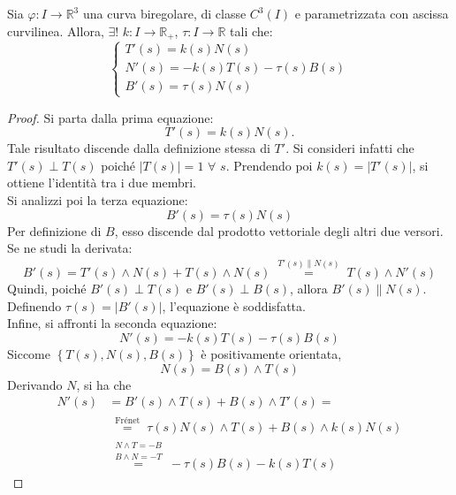 \begin{theorem} \label{Teo: Formule di Frénet}
    Sia $\varphi: I \to \mathbb{R}^3$ una curva biregolare, di classe $C^3(I)$ e parametrizzata con ascissa curvilinea. Allora, $\exists!$ $k:I\to \mathbb{R}_+$, $\tau:I\to\mathbb{R}$ tali che:
    \begin{equation*}
        \begin{cases}
            T'(s)=k(s)N(s)\\
            N'(s)=-k(s)T(s)-\tau(s)B(s)\\
            B'(s)=\tau(s)N(s)
        \end{cases}
    \end{equation*}
    \end{theorem}
    \begin{proof}
        Si parta dalla prima equazione: 
        \begin{equation*}
            T'(s)=k(s)N(s).        
        \end{equation*}
        Tale risultato discende dalla definizione stessa di $T'$. Si consideri infatti che $T'(s)\perp T(s)$ poiché $|T(s)|=1$ $\forall$ $s$. Prendendo poi $k(s)=|T'(s)|$, si ottiene l'identità tra i due membri.\\
        Si analizzi poi la terza equazione:
        \begin{equation*}
            B'(s)=\tau(s)N(s)
        \end{equation*}
        Per definizione di $B$, esso discende dal prodotto vettoriale degli altri due versori. Se ne studi la derivata:
        \begin{equation*}
            B'(s)=T'(s)\wedge N(s) + T(s) \wedge N(s) \overset{\substack{T'(s)\parallel N(s)}}{=} T(s)\wedge N'(s)
        \end{equation*}
        Quindi, poiché $B'(s)\perp T(s)$ e $B'(s) \perp B(s)$, allora $B'(s) \parallel N(s)$. Definendo $\tau(s)=|B'(s)|$, l'equazione è soddisfatta.\\
        Infine, si affronti la seconda equazione:
        \begin{equation*}
            N'(s)= -k(s)T(s)- \tau(s)B(s)
        \end{equation*}
        Siccome $\left\{T(s), N(s), B(s)\right\}$ è positivamente orientata,
        \begin{equation*}
            N(s)=B(s) \wedge T(s)
        \end{equation*}
        Derivando $N$, si ha che
        \begin{equation*}
            \begin{aligned}
                N'(s)&=B'(s)\wedge T(s) + B(s) \wedge T'(s)=\\
                &\overset{\substack{\text{Frénet}}}{=} \tau(s)N(s)\wedge T(s) + B(s) \wedge k(s)N(s)\\
                &\overset{\substack{N \wedge T = -B\\B \wedge N =-T}}{=} -\tau(s)B(s)- k(s)T(s)
            \end{aligned}
        \end{equation*}
    \end{proof}
